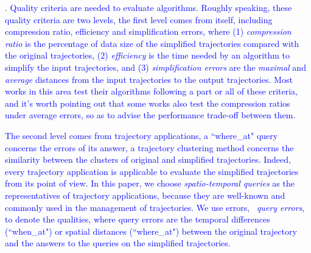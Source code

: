 {\stitle{\textcolor{blue}{Quality criteria}}. 
\textcolor{blue}{Quality criteria are needed to evaluate \lsa algorithms. Roughly speaking, these quality criteria are two levels, the first level comes from \lsa itself, including compression ratio, efficiency and simplification errors, where 
	(1) \emph{compression ratio} is the percentage of data size of the simplified trajectories compared with the original trajectories, 
	(2) \emph{efficiency} is the time needed by an \lsa algorithm to simplify the input trajectories, and
	(3) \emph{simplification errors} are the \emph{maximal} and \emph{average} distances from the input trajectories to the output trajectories.
Most works in this area test their algorithms following a part or all of these criteria, and it's worth pointing out that some works \cite{Zhang:Evaluation,Cao:Dots,Wu:Graph} also test the compression ratios under average errors, so as to advise the performance trade-off between them.}
	
	
\textcolor{blue}{The second level comes from trajectory applications, \eg a ``where\_at" query concerns the errors of its answer, a trajectory clustering method concerns the similarity between the clusters of original and simplified trajectories. Indeed, every trajectory application is applicable to evaluate the simplified trajectories from its point of view.}	
%
\textcolor{blue}{In this paper, we choose \emph{spatio-temporal queries} \cite{Cao:Spatio} as the representatives of trajectory applications, because they are well-known and commonly used in the management of trajectories.}
%
\textcolor{blue}{We use errors, \ie~\emph{query errors}, to denote the qualities, where query errors are the temporal differences (\eg ``when\_at") or spatial distances (\eg ``where\_at") between the original trajectory and the answers to the queries on the simplified trajectories.}






}
